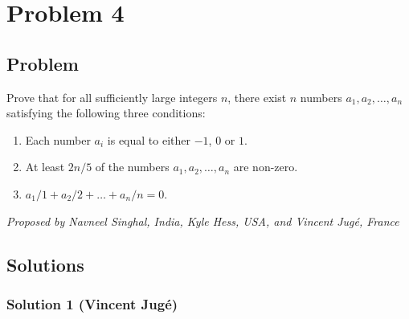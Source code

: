 \section{Problem 4}
\subsection{Problem}
Prove that for all sufficiently large integers $n$, there exist $n$ numbers $a_1,a_2,\ldots,a_n$ satisfying the following three conditions:
\begin{enumerate}
    \item Each number $a_i$ is equal to either $-1$, $0$ or $1$.
    \item At least $2n/5$ of the numbers  $a_1,a_2,\ldots, a_n$ are non-zero.
    \item $a_1/1+a_2/2+\ldots+a_n/n=0$.
\end{enumerate}
\textit{Proposed by Navneel Singhal, India, Kyle Hess, USA, and Vincent Jugé, France}

\subsection{Solutions}

\subsubsection{Solution 1 (Vincent Jugé)}

